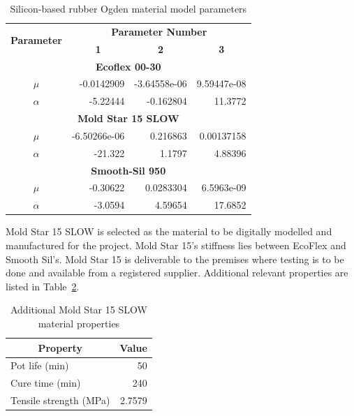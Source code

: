 \begin{table}[H]
\centering
\caption[Ogden material model parameters]{Silicon-based rubber Ogden material model parameters \citep{Ellis2020}}
\label{tab:ogdpar}
\begin{tabular}{@{}crrr@{}}
\toprule
\multirow{2}{*}{\textbf{Parameter}} & \multicolumn{3}{c}{\textbf{Parameter Number}}                                                    \\ \cmidrule(l){2-4} 
                                    & \multicolumn{1}{c}{\textbf{1}} & \multicolumn{1}{c}{\textbf{2}} & \multicolumn{1}{c}{\textbf{3}} \\ \midrule
\multicolumn{4}{c}{\textbf{Ecoflex 00-30}}           \\ \midrule
$\mu$    & -0.0142909   & -3.64558e-06 & 9.59447e-08 \\
$\alpha$ & -5.22444     & -0.162804    & 11.3772     \\ \midrule
\multicolumn{4}{c}{\textbf{Mold Star 15 SLOW}}       \\ \midrule
$\mu$    & -6.50266e-06 & 0.216863     & 0.00137158  \\
$\alpha$ & -21.322      & 1.1797       & 4.88396     \\ \midrule
\multicolumn{4}{c}{\textbf{Smooth-Sil 950}}          \\ \midrule
$\mu$    & -0.30622     & 0.0283304    & 6.5963e-09  \\
$\alpha$ & -3.0594      & 4.59654      & 17.6852     \\ \bottomrule
\end{tabular}
\end{table}

Mold Star 15 SLOW is selected as the material to be digitally modelled and manufactured for the project. Mold Star 15's stiffness lies between EcoFlex and Smooth Sil's. Mold Star 15 is deliverable to the premises where testing is to be done and available from a registered supplier. Additional relevant properties are listed in Table~\ref{tab:msp}.

\begin{table}[H]
\centering
\caption[Mold Star 15 material properties]{Additional Mold Star 15 SLOW material properties \citep{MoldStar}}
\label{tab:msp}
\begin{tabular}{@{}lr@{}}
\toprule
\multicolumn{1}{c}{\textbf{Property}} & \multicolumn{1}{c}{\textbf{Value}} \\ \midrule
Pot life (\si{\minute})                        & 50                                 \\
Cure time (\si{\minute})                       & 240                                \\
Tensile strength (\si{MPa})                & 2.7579                             \\ \bottomrule
\end{tabular}
\end{table}

